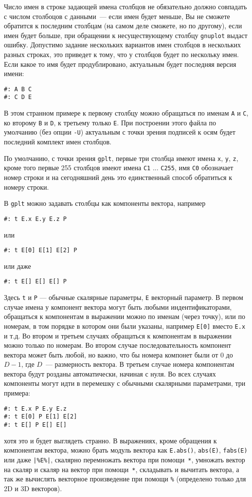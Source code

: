 \documentclass[12pt]{article}
\def\gplt{{\tt gplt}}
\def\gnuplot{{\tt gnuplot}}
\begin{document}
Число имен в строке задающей имена столбцов не обязательно должно совпадать с числом столбоцов с данными~--- если имен будет меньше, Вы не сможете обратится к
последним столбцам (на самом деле сможете, но по другому), если имен будет больше, при обращении к несуществующему столбцу \gnuplot{} выдаст ошибку.
Допустимо задание нескольких вариантов имен столбцов в нескольких разных строках, это приведет к тому, что у столбцов будет по нескольку имен.
Если какое то имя будет продублировано, актуальным будет последняя версия имени:
\begin{verbatim}
#: A B C
#: C D E
\end{verbatim}
В этом странном примере к первому столбцу можно обращаться по именам \verb'A' и \verb'C', ко второму  \verb'B' и \verb'D', к третьему только \verb'E'.
При построении этого файла по умолчанию (без опции \verb'-U') актуальным с точки зрения подписей к осям будет последний комплект имен столбцов. 

По умолчанию, с точки зрения \gplt,  первые три столбца имеют имена \verb'x', \verb'y', \verb'z', кроме того первые 255 столбцов имеют имена \verb'C1' ... \verb'C255',
имя \verb'C0' обозначает номер строки и на сегодняшний день это единственный способ обратиться к номеру строки. 

В \gplt{} можно задавать столбцы как компоненты вектора, например
\begin{verbatim}
#: t E.x E.y E.z P 
\end{verbatim}
или
\begin{verbatim}
#: t E[0] E[1] E[2] P 
\end{verbatim}
или даже
\begin{verbatim}
#: t E[] E[] E[] P 
\end{verbatim}
Здесь \verb't' и \verb'P' --- обычные скалярные параметры, \verb'E' векторный параметр.
В первом случае имена у компонент вектора могут быть любыми индентификаторами, обращаться к компонентам в выражении можно
по именам (через точку), или по номерам, в том порядке в котором они были указаны, например \verb'E[0]' вместо \verb'E.x' и т.д.
Во втором и третьем случаях обращаться к компонентам в выражении можно только по номерам.
Во втором случае последовательность компонент
 вектора может быть любой, но важно, что бы номера компонет были от $0$ до $D-1$, где $D$~--- размерность вектора. В третьем случае
 номера компонентам вектора будут розданы автоматически, начиная с нуля.
Во всех случаях компоненты могут идти в перемешку с обычными скалярными параметрами, три примера:
\begin{verbatim}
#: t E.x P E.y E.z  
#: t E[0] P E[1] E[2]
#: t E[] P E[] E[]  
\end{verbatim}
хотя это и будет выглядеть странно.
В выражениях, кроме обращения к компонентам вектора, можно брать модуль вектора как \verb'E.abs()', \verb'abs(E)',  \verb'fabs(E)' или даже  \verb'|%E%|',
скалярно перемножать вектора при помощи~\verb'*',
умножать вектор на скаляр и скаляр на вектор при помощи~\verb'*', складывать и вычитать вектора, а так же вычислять векторное произведение при помощи \verb'%'
(определено только для 2D и 3D векторов).
\end{document}
